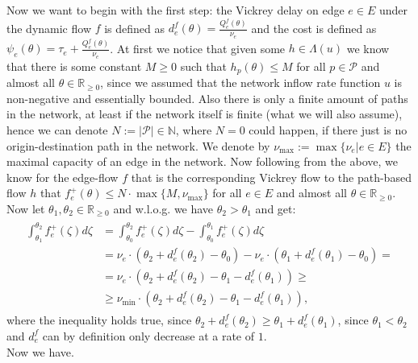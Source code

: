\documentclass[reqno,openany]{amsbook}
\theoremstyle{definition}
\theoremstyle{plain}
\begin{document}
Now we want to begin with the first step: the Vickrey delay on edge $e \in E$ under the dynamic flow $f$ is defined as $d_e^f(\theta) = \frac{Q_e^f(\theta)}{\nu_e}$ and the cost is defined as $\psi_e(\theta) = \tau_e + \frac{Q_e^f(\theta)}{\nu_e}$. At first we notice that given some $h \in \Lambda(u)$ we know that there is some constant $M \geq 0$ such that $h_p(\theta) \leq M$ for all $p \in \mathcal{P}$ and almost all $\theta \in \mathbb{R}_{\geq 0}$, since we assumed that the network inflow rate function $u$ is non-negative and essentially bounded. Also there is only a finite amount of paths in the network, at least if the network itself is finite (what we will also assume), hence we can denote $N := \lvert \mathcal{P} \rvert \in \mathbb{N}$, where $N = 0$ could happen, if there just is no origin-destination path in the network. We denote by $\nu_{\max} := \max\{ \nu_e \vert e \in E \}$ the maximal capacity of an edge in the network. Now following from the above, we know for the edge-flow $f$ that is the corresponding Vickrey flow to the path-based flow $h$ that $f_e^+(\theta) \leq N \cdot \max\{M, \nu_{\max}\}$ for all $e \in E$ and almost all $\theta \in \mathbb{R}_{\geq 0}$. \\
Now let $\theta_1, \theta_2 \in \mathbb{R}_{\geq 0}$ and w.l.o.g. we have $\theta_2 > \theta_1$ and get:
\begin{align}
	\begin{split}
		\int_{\theta_1}^{\theta_2} f_e^+(\zeta) d\zeta &= \int_{\theta_0}^{\theta_2} f_e^+(\zeta) d\zeta - 
		\int_{\theta_0}^{\theta_1} f_e^+(\zeta) d\zeta \\
		&= \nu_e \cdot (\theta_2 + d_e^f(\theta_2) - \theta_0) - \nu_e \cdot (\theta_1 + d_e^f(\theta_1) - \theta_0)  =\\
		&= \nu_e \cdot (\theta_2 + d_e^f(\theta_2) - \theta_1 - d_e^f(\theta_1)) \geq\\
		&\geq \nu_{\min} \cdot (\theta_2 + d_e^f(\theta_2) - \theta_1 - d_e^f(\theta_1)),
	\end{split}
\end{align}
where the inequality holds true, since $\theta_2 + d_e^f(\theta_2) \geq \theta_1 + d_e^f(\theta_1)$, since $\theta_1 < \theta_2$ and $d_e^f$ can by definition only decrease at a rate of $1$.\\
Now we have. 
\end{document}
